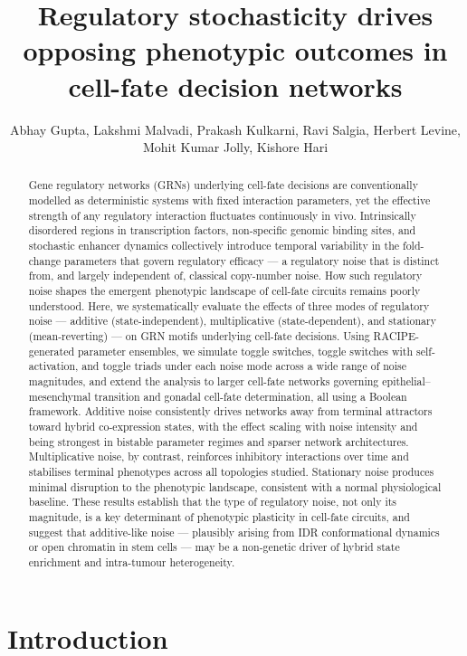 \documentclass[11pt]{article}
\title{Regulatory stochasticity drives opposing phenotypic outcomes in cell-fate decision networks\\

}
\author{Abhay Gupta, Lakshmi Malvadi, Prakash Kulkarni, Ravi Salgia, Herbert Levine, \\ Mohit Kumar Jolly, Kishore Hari}
\begin{document}
\maketitle

\begin{abstract}
Gene regulatory networks (GRNs) underlying cell-fate decisions are conventionally modelled as deterministic systems with fixed interaction parameters, yet the effective strength of any regulatory interaction fluctuates continuously in vivo. Intrinsically disordered regions in transcription factors, non-specific genomic binding sites, and stochastic enhancer dynamics collectively introduce temporal variability in the fold-change parameters that govern regulatory efficacy --- a regulatory noise that is distinct from, and largely independent of, classical copy-number noise. How such regulatory noise shapes the emergent phenotypic landscape of cell-fate circuits remains poorly understood. Here, we systematically evaluate the effects of three modes of regulatory noise --- additive (state-independent), multiplicative (state-dependent), and stationary (mean-reverting) --- on GRN motifs underlying cell-fate decisions. Using RACIPE-generated parameter ensembles, we simulate toggle switches, toggle switches with self-activation, and toggle triads under each noise mode across a wide range of noise magnitudes, and extend the analysis to larger cell-fate networks governing epithelial--mesenchymal transition and gonadal cell-fate determination, all using a Boolean framework. Additive noise consistently drives networks away from terminal attractors toward hybrid co-expression states, with the effect scaling with noise intensity and being strongest in bistable parameter regimes and sparser network architectures. Multiplicative noise, by contrast, reinforces inhibitory interactions over time and stabilises terminal phenotypes across all topologies studied. Stationary noise produces minimal disruption to the phenotypic landscape, consistent with a normal physiological baseline. These results establish that the type of regulatory noise, not only its magnitude, is a key determinant of phenotypic plasticity in cell-fate circuits, and suggest that additive-like noise --- plausibly arising from IDR conformational dynamics or open chromatin in stem cells --- may be a non-genetic driver of hybrid state enrichment and intra-tumour heterogeneity.
\end{abstract}

\section{Introduction}\label{sec:Intro}
\end{document}
